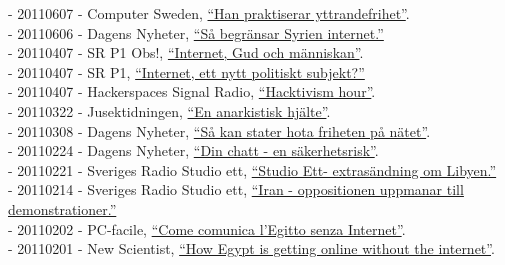 \documentclass[a4paper,11pt,oneside]{article}
\begin{document}
{    - 20110607 - Computer Sweden, \href{http://computersweden.idg.se/2.2683/1.388901/han-praktiserar-yttrandefrihet}{``Han praktiserar yttrandefrihet''}. \\
    - 20110606 - Dagens Nyheter, \href{http://www.dn.se/nyheter/varlden/sa-begransar-syrien-friheten-pa-internet}{``Så begränsar Syrien internet.''} \\
    - 20110407 - SR P1 Obs!, \href{http://t.sr.se/1zjt3PQ}{``Internet, Gud och människan''}. \\
    - 20110407 - SR P1, \href{http://t.sr.se/PbptWr}{``Internet, ett nytt politiskt subjekt?''} \\
    - 20110407 - Hackerspaces Signal Radio, \href{http://signal.hackerspaces.org/archive/2011-04-07-2200-hacktivism-hour.mp3}{``Hacktivism hour''}. \\
    - 20110322 - Jusektidningen, \href{http://www.tidningenkarriar.se/Arkivet/2011/3/Anarkistisk-hjalte/}{``En anarkistisk hjälte''}. \\
    - 20110308 - Dagens Nyheter, \href{http://www.dn.se/vart-internet/vart-internet-hem/sa-kan-stater-hota-friheten-pa-natet/}{``Så kan stater hota friheten på nätet''}. \\
    - 20110224 - Dagens Nyheter, \href{http://www.dn.se/vart-internet/vart-internet-hem/din-chatt-en-sakerhetsrisk/}{``Din chatt - en säkerhetsrisk''}. \\
    - 20110221 - Sveriges Radio Studio ett, \href{http://t.sr.se/1cUlHfI}{``Studio Ett- extrasändning om Libyen.''} \\
    - 20110214 - Sveriges Radio Studio ett, \href{http://t.sr.se/1D1zCXq}{``Iran - oppositionen uppmanar till demonstrationer.''} \\
    - 20110202 - PC-facile, \href{http://www.pc-facile.com/news/come_comunica_egitto_senza_internet/68959.htm}{``Come comunica l'Egitto senza Internet''}. \\
    - 20110201 - New Scientist, \href{http://www.newscientist.com/blogs/onepercent/2011/02/egypt-remains-officially-offli.html}{``How Egypt is getting online without the internet''}. \\
}
\end{document}
